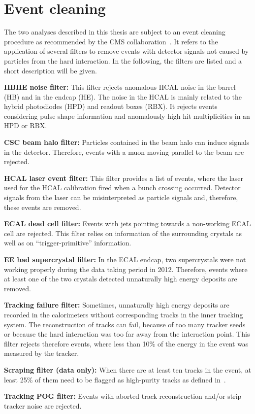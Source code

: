 \section{Event cleaning}
The two analyses described in this thesis are subject to an event cleaning procedure as recommended by the CMS collaboration~\cite{bib:CMS:EventCleaning}.
It refers to the application of several filters to remove events with detector signals not caused by particles from the hard interaction. 
In the following, the filters are listed and a short description will be given.
\begin{description} 
\item \textbf{HBHE noise filter:} This filter rejects anomalous HCAL noise in the barrel (HB) and in the endcap (HE). 
                                  The noise in the HCAL is mainly related to the hybrid photodiodes (HPD) and readout boxes (RBX). 
                                  It rejects events considering pulse shape information and anomalously high hit multiplicities in an HPD or RBX.
\item \textbf{CSC beam halo filter:} Particles contained in the beam halo can induce signals in the detector. 
                                     Therefore, events with a muon moving parallel to the beam are rejected.  
\item \textbf{HCAL laser event filter:} This filter provides a list of events, where the laser used for the HCAL calibration fired when a bunch crossing occurred. 
                                        Detector signals from the laser can be misinterpreted as particle signals and, therefore, these events are removed.
\item \textbf{ECAL dead cell filter:} Events with jets pointing towards a non-working ECAL cell are rejected. 
                                      This filter relies on information of the surrounding crystals as well as on ``trigger-primitive'' information.
\item \textbf{EE bad supercrystal filter:} In the ECAL endcap, two supercrystals were not working properly during the data taking period in 2012. 
                                           Therefore, events where at least one of the two crystals detected unnaturally high energy deposits are removed. 
\item \textbf{Tracking failure filter:} Sometimes, unnaturally high energy deposits are recorded in the calorimeters without corresponding tracks in the inner tracking system. 
                                        The reconstruction of tracks can fail, because of too many tracker seeds or because the hard interaction was too far away from the interaction point.
                                        This filter rejects therefore events, where less than 10\% of the energy in the event was measured by the tracker.  
\item \textbf{Scraping filter (data only):} When there are at least ten tracks in the event, at least 25\% of them need to be flagged as high-purity tracks as defined in~\cite{bib:CMS:Tracking_2010}.
\item \textbf{Tracking POG filter:} Events with aborted track reconstruction and/or strip tracker noise are rejected.
\end{description}

